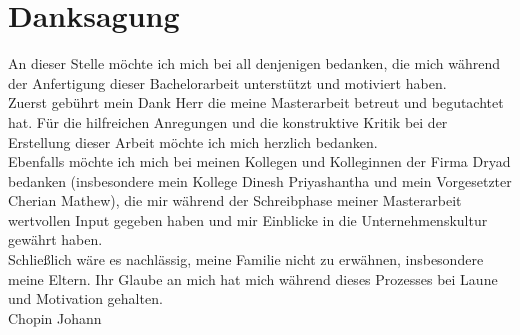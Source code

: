 
\bigskip

\begingroup
\let\clearpage\relax
\let\cleardoublepage\relax
\let\cleardoublepage\relax
\chapter*{Danksagung}
An dieser Stelle möchte ich mich bei all denjenigen bedanken, die mich während der Anfertigung dieser Bachelorarbeit unterstützt und motiviert haben.\\

Zuerst gebührt mein Dank Herr \myFirstProf die meine Masterarbeit betreut und begutachtet hat. Für die hilfreichen Anregungen und die konstruktive Kritik bei der Erstellung dieser Arbeit möchte ich mich herzlich bedanken.\\

Ebenfalls möchte ich mich bei meinen Kollegen und Kolleginnen der Firma Dryad bedanken (insbesondere mein Kollege Dinesh Priyashantha und mein Vorgesetzter Cherian Mathew), die mir während der Schreibphase meiner Masterarbeit wertvollen Input gegeben haben und mir Einblicke in die Unternehmenskultur gewährt haben.\\

Schließlich wäre es nachlässig, meine Familie nicht zu erwähnen, insbesondere meine Eltern. Ihr Glaube an mich hat mich während dieses Prozesses bei Laune und Motivation gehalten.\\

Chopin Johann
\endgroup

